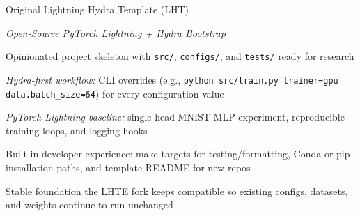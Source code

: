 \begin{slide}[\slideopts,toc={Original LHT}]{Original Lightning Hydra Template (LHT)}

  \emph{Open-Source PyTorch Lightning + Hydra Bootstrap}

  \begin{itemize}
    \mpitem Opinionated project skeleton with \texttt{src/}, \texttt{configs/}, and \texttt{tests/} ready for research

    \mpitem \emph{Hydra-first workflow:} CLI overrides (e.g., \texttt{python src/train.py trainer=gpu data.batch_size=64}) for every configuration value

    \mpitem \emph{PyTorch Lightning baseline:} single-head MNIST MLP experiment, reproducible training loops, and logging hooks

    \mpitem Built-in developer experience: make targets for testing/formatting, Conda or pip installation paths, and template README for new repos

    \mpitem Stable foundation the LHTE fork keeps compatible so existing configs, datasets, and weights continue to run unchanged
  \end{itemize}

\end{slide}

